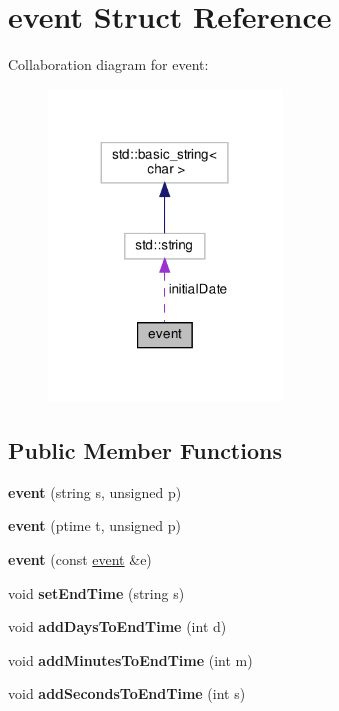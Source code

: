 \hypertarget{structevent}{}\section{event Struct Reference}
\label{structevent}


Collaboration diagram for event\+:
\nopagebreak
\begin{figure}[H]
\begin{center}
\leavevmode
\includegraphics[width=176pt]{structevent__coll__graph}
\end{center}
\end{figure}
\subsection*{Public Member Functions}
\begin{DoxyCompactItemize}
\item 
\mbox{\label{structevent_a730f8d0598f47a0991bf1e4148435b2d}} 
{\bfseries event} (string s, unsigned p)
\item 
\mbox{\label{structevent_a4f61b72722376cd96b7e04218144acbf}} 
{\bfseries event} (ptime t, unsigned p)
\item 
\mbox{\label{structevent_a8db259e5b385cc72d89aec4a32696f7b}} 
{\bfseries event} (const \mbox{\hyperlink{structevent}{event}} \&e)
\item 
\mbox{\label{structevent_abbe5e998115b21515138c27e290e3110}} 
void {\bfseries set\+End\+Time} (string s)
\item 
\mbox{\label{structevent_ab21a6b2eea8829fd6d7ed60868472d1f}} 
void {\bfseries add\+Days\+To\+End\+Time} (int d)
\item 
\mbox{\label{structevent_a0cb1cccaf2a6e06ad214ce66ae06befb}} 
void {\bfseries add\+Minutes\+To\+End\+Time} (int m)
\item 
\mbox{\label{structevent_a1f28e916e6863e303f60802e951fb37f}} 
void {\bfseries add\+Seconds\+To\+End\+Time} (int s)
\end{DoxyCompactItemize}
